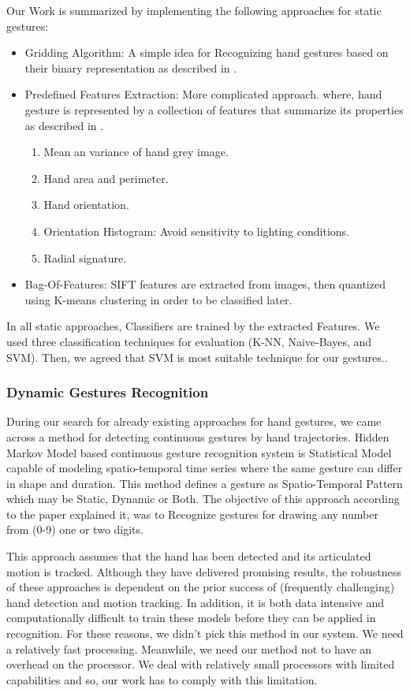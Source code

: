 Our Work is summarized by implementing the following approaches for static gestures:
\begin{itemize}
\item Gridding Algorithm: A simple idea for Recognizing hand gestures based on their binary representation as described in \cite{paper1sb}.
\bigskip

\item Predefined Features Extraction: More complicated approach. where, hand gesture is represented by a collection of features that summarize its properties as described in \cite{paper2sT}.
\begin{enumerate}
\item Mean an variance of hand grey image.
\item Hand area and perimeter.
\item Hand orientation.
\item Orientation Histogram: Avoid sensitivity to lighting conditions. 
\item Radial signature.
\end{enumerate}
\bigskip

\item Bag-Of-Features: SIFT features are extracted from images, then quantized using K-means clustering in order to be classified later.
\end{itemize}
\bigskip

In all static approaches, Classifiers are trained by the extracted Features. 
We used three classification techniques for evaluation (K-NN, Naive-Bayes, and SVM). Then, we agreed that SVM is most suitable technique for our gestures..

\subsubsection{Dynamic Gestures Recognition} 
During our search for already existing approaches for hand gestures, we came across a method 
for detecting continuous gestures by hand trajectories. Hidden Markov Model based \cite{hoda} 
continuous gesture recognition system is Statistical Model capable of modeling spatio-temporal 
time series where the same gesture can differ in shape and duration. This method defines a 
gesture as Spatio-Temporal Pattern which may be Static, Dynamic or Both. The objective of 
this approach according to the paper explained it, was to Recognize gestures for drawing any 
number from (0-9) one or two digits.
\bigskip

This approach assumes that the hand has been detected and its articulated motion is tracked. 
Although they have delivered promising results, the robustness of these approaches is dependent 
on the prior success of (frequently challenging) hand detection and motion tracking. In addition, 
it is both data intensive and computationally difficult to train these models before they can be 
applied in recognition. For these reasons, we didn’t pick this method in our system. We need a 
relatively fast processing. Meanwhile, we need our method not to have an overhead on the 
processor. We deal with relatively small processors with limited capabilities and so, our work has 
to comply with this limitation.
\bigskip